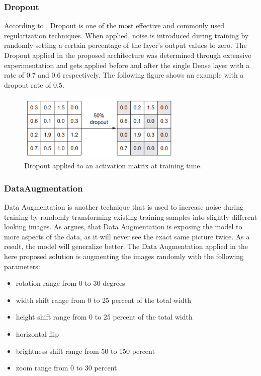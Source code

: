 \subsubsection{Dropout}
According to \citet{Chollet:2017:DeepLearningPython}, Dropout is one of the most effective and commonly used regularization techniques. When applied, noise is introduced during training by randomly setting a certain percentage of the layer's output values to zero. The Dropout applied in the proposed architecture was determined through extensive experimentation and gets applied before and after the single Dense layer with a rate of 0.7 and 0.6 respectively. The following figure shows an example with a dropout rate of 0.5.

\begin{figure}[H]
  \begin{center}
  \includegraphics[angle=0, width=0.7\textwidth]{Figures/dropout.PNG}
  \caption{Dropout applied to an activation matrix at training time.\citep{Chollet:2017:DeepLearningPython}}
  \label{fig:Dropout}
  \end{center}
\end{figure}

\subsubsection{DataAugmentation}
Data Augmentation is another technique that is used to increase noise during training by randomly transforming existing training samples into slightly different looking images. As \citet{Chollet:2017:DeepLearningPython} argues, that Data Augmentation is exposing the model to more aspects of the data, as it will never see the exact same picture twice. As a result, the model will generalize better.
The Data Augmentation applied in the here proposed solution is augmenting the images randomly with the following parameters:

\begin{itemize}
    \item rotation range from 0 to 30 degrees
    \item width shift range from 0 to 25 percent of the total width
    \item height shift range from 0 to 25 percent of the total width
    \item horizontal flip
    \item brightness shift range from 50 to 150 percent
    \item zoom range from 0 to 30 percent
\end{itemize}


